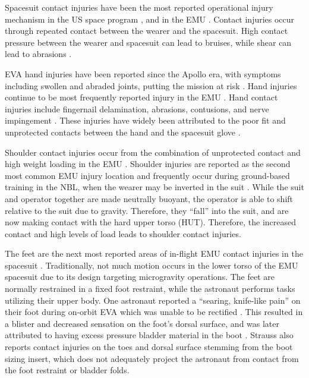 \documentclass[defaultstyle,11pt]{comps}
\begin{document}
Spacesuit contact injuries have been the most reported operational injury mechanism in the US space program \citep{Scheuring2008}, and in the EMU \citep{Strauss2004, Viegas2004, Scheuring2012}.
Contact injuries occur through repeated contact between the wearer and the spacesuit.
High contact pressure between the wearer and spacesuit can lead to bruises, while shear can lead to abrasions \citep{Mailler2004, Carlson2006}.

EVA hand injuries have been reported since the Apollo era, with symptoms including swollen and abraded joints, putting the mission at risk \citep{Scheuring2012}.
Hand injuries continue to be most frequently reported injury in the EMU \citep{Strauss2004, Viegas2004, Scheuring2012}.
Hand contact injuries include fingernail delamination, abrasions, contusions, and nerve impingement \citep{Strauss2004, Viegas2004, Scheuring2012}.
These injuries have widely been attributed to the poor fit and unprotected contacts between the hand and the spacesuit glove \citep{Strauss2004, Viegas2004}.

Shoulder contact injuries occur from the combination of unprotected contact and high weight loading in the EMU \citep{Strauss2004, Viegas2004, Anderson2015a}.
Shoulder injuries are reported as the second most common EMU injury location and frequently occur during ground-based training in the NBL, when the wearer may be inverted in the suit \citep{Strauss2004, Viegas2004}.
While the suit and operator together are made neutrally buoyant, the operator is able to shift relative to the suit due to gravity.
Therefore, they ``fall'' into the suit, and are now making contact with the hard upper torso (HUT).
Therefore, the increased contact and high levels of load leads to shoulder contact injuries.

The feet are the next most reported areas of in-flight EMU contact injuries in the spacesuit \citep{Scheuring2012}.
Traditionally, not much motion occurs in the lower torso of the EMU spacesuit due to its design targeting microgravity operations.
The feet are normally restrained in a fixed foot restraint, while the astronaut performs tasks utilizing their upper body.
One astronaut reported a ``searing, knife-like pain'' on their foot during on-orbit EVA which was unable to be rectified \citep{Scheuring2012}.
This resulted in a blister and decreased sensation on the foot's dorsal surface, and was later attributed to having excess pressure bladder material in the boot \citep{Scheuring2012}.
Strauss \citep{Strauss2004} also reports contact injuries on the toes and dorsal surface stemming from the boot sizing insert, which does not adequately project the astronaut from contact from the foot restraint or bladder folds.
\end{document}
